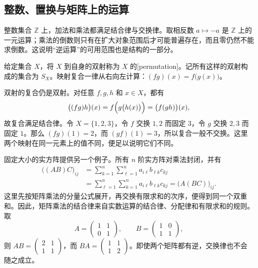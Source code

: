 \subsection{整数、置换与矩阵上的运算}
\label{b1:subsec:0101:02}

整数集合 \(\mathbb Z\) 上，加法和乘法都满足结合律与交换律。取相反数 \(a\mapsto -a\) 是 \(\mathbb Z\) 上的一元运算；乘法的倒数则只有在扩大对象范围后才可能普遍存在，而且零仍然不能求倒数。这说明“逆运算”的可用范围也是结构的一部分。

\begin{definition}\label{b1:def:permutation}
	给定集合 \(X\)，将 \(X\) 到自身的双射称为 \(X\) 的[permutation]。记所有这样的双射构成的集合为 \(S_X\)。映射复合一律从右向左计算：\((fg)(x)=f\bigl(g(x)\bigr)\)。
\end{definition}


双射的复合仍是双射。对任意 \(f,g,h\) 和 \(x\in X\)，都有
\[
	\bigl((fg)h\bigr)(x)=f\Bigl(g\bigl(h(x)\bigr)\Bigr)=\bigl(f(gh)\bigr)(x),
\]
故复合满足结合律。令 \(X=\{1,2,3\}\)，令 \(f\) 交换 \(1,2\) 而固定 \(3\)，令 \(g\) 交换 \(2,3\) 而固定 \(1\)。那么 \((fg)(1)=2\)，而 \((gf)(1)=3\)，所以复合一般不交换。这里两个映射在同一元素上的值不同，便足以说明它们不同。

\ProseParagraphBreak
固定大小的实方阵提供另一个例子。所有 \(n\) 阶实方阵对乘法封闭，并有
\[
	\begin{aligned}
		\bigl((AB)C\bigr)_{ij} &=\sum_{k=1}^{n}\sum_{\ell=1}^{n}a_{i\ell}b_{\ell k}c_{kj}\\
		&=\sum_{\ell=1}^{n}\sum_{k=1}^{n}a_{i\ell}b_{\ell k}c_{kj} =\bigl(A(BC)\bigr)_{ij}.
	\end{aligned}
\]
这里先按矩阵乘法的分量公式展开，再交换有限求和的次序，便得到同一个双重和。因此，矩阵乘法的结合律来自实数运算的结合律、分配律和有限求和的规则。取
\[
	A=\begin{pmatrix}1&1\\0&1\end{pmatrix},\qquad
	B=\begin{pmatrix}1&0\\1&1\end{pmatrix},
\]
则 \(AB=\begin{pmatrix}2&1\\1&1\end{pmatrix}\)，而
\(BA=\begin{pmatrix}1&1\\1&2\end{pmatrix}\)。即使两个矩阵都有逆，交换律也不会随之成立。

